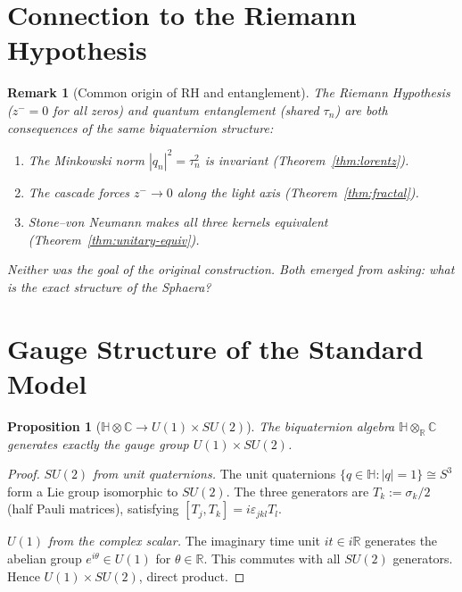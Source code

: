 \documentclass[12pt,a4paper]{article}
\newtheorem{proposition}[theorem]{Proposition}
\newtheorem*{remark}{Remark}
\newcommand{\zminus}{z^-}
\newcommand{\HH}{\mathbb{H}}
\begin{document}
\section{Connection to the Riemann Hypothesis}
\label{sec:rh}

\begin{remark}[Common origin of RH and entanglement]
The Riemann Hypothesis ($\zminus=0$ for all zeros) and quantum
entanglement (shared $\tau_n$) are both consequences of the same
biquaternion structure:
\begin{enumerate}
  \item The Minkowski norm $|q_n|^2=\tau_n^2$ is invariant
        (Theorem~\ref{thm:lorentz}).
  \item The cascade forces $\zminus\to 0$ along the light axis
        (Theorem~\ref{thm:fractal}).
  \item Stone--von Neumann makes all three kernels equivalent
        (Theorem~\ref{thm:unitary-equiv}).
\end{enumerate}
Neither was the goal of the original construction.
Both emerged from asking: what is the exact structure of the Sphaera?
\end{remark}


\section{Gauge Structure of the Standard Model}
\label{sec:gauge}

\begin{proposition}[$\HH\otimes\mathbb{C}\to U(1)\times SU(2)$]
The biquaternion algebra $\HH\otimes_{\mathbb{R}}\mathbb{C}$ generates
exactly the gauge group $U(1)\times SU(2)$.
\end{proposition}

\begin{proof}
\emph{$SU(2)$ from unit quaternions.}
The unit quaternions $\{q\in\HH:|q|=1\}\cong S^3$ form a Lie group
isomorphic to $SU(2)$.
The three generators are $T_k:=\sigma_k/2$ (half Pauli matrices),
satisfying $[T_j,T_k]=i\varepsilon_{jkl}T_l$.

\emph{$U(1)$ from the complex scalar.}
The imaginary time unit $it\in i\mathbb{R}$ generates the abelian group
$e^{i\theta}\in U(1)$ for $\theta\in\mathbb{R}$.
This commutes with all $SU(2)$ generators.
Hence $U(1)\times SU(2)$, direct product.
\end{proof}
\end{document}
